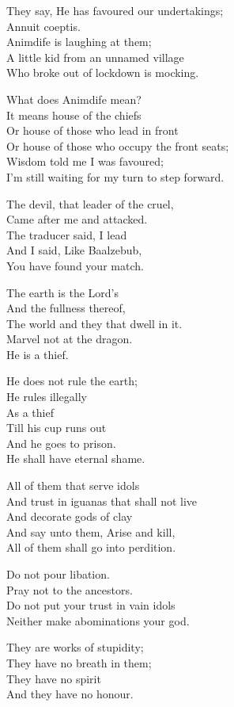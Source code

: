 \documentclass[
]{book}
\begin{document}
They say, He has favoured our undertakings;\\
Annuit coeptis.\\
Animdife is laughing at them;\\
A little kid from an unnamed village\\
Who broke out of lockdown is mocking.

What does Animdife mean?\\
It means house of the chiefs\\
Or house of those who lead in front\\
Or house of those who occupy the front seats;\\
Wisdom told me I was favoured;\\
I'm still waiting for my turn to step forward.

The devil, that leader of the cruel,\\
Came after me and attacked.\\
The traducer said, I lead\\
And I said, Like Baalzebub,\\
You have found your match.

The earth is the Lord's\\
And the fullness thereof,\\
The world and they that dwell in it.\\
Marvel not at the dragon.\\
He is a thief.

He does not rule the earth;\\
He rules illegally\\
As a thief\\
Till his cup runs out\\
And he goes to prison.\\
He shall have eternal shame.

All of them that serve idols\\
And trust in iguanas that shall not live\\
And decorate gods of clay\\
And say unto them, Arise and kill,\\
All of them shall go into perdition.

Do not pour libation.\\
Pray not to the ancestors.\\
Do not put your trust in vain idols\\
Neither make abominations your god.

They are works of stupidity;\\
They have no breath in them;\\
They have no spirit\\
And they have no honour.
\end{document}
